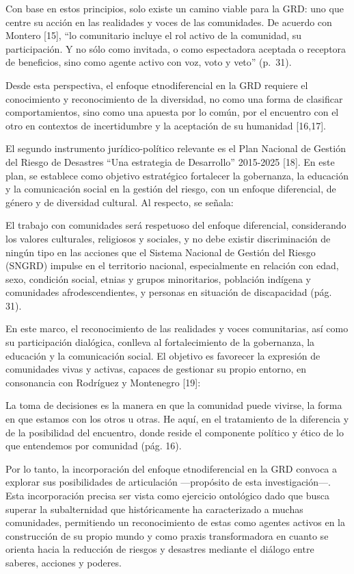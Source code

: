 \documentclass[
  spanish,
  letterpaper,
]{book}
\begin{document}
Con base en estos principios, solo existe un camino viable para la GRD:
uno que centre su acción en las realidades y voces de las comunidades.
De acuerdo con Montero {[}15{]}, ``lo comunitario incluye el rol activo
de la comunidad, su participación. Y no sólo como invitada, o como
espectadora aceptada o receptora de beneficios, sino como agente activo
con voz, voto y veto'' (p.~31).

Desde esta perspectiva, el enfoque etnodiferencial en la GRD requiere el
conocimiento y reconocimiento de la diversidad, no como una forma de
clasificar comportamientos, sino como una apuesta por lo común, por el
encuentro con el otro en contextos de incertidumbre y la aceptación de
su humanidad {[}16,17{]}.

El segundo instrumento jurídico-político relevante es el Plan Nacional
de Gestión del Riesgo de Desastres ``Una estrategia de Desarrollo''
2015-2025 {[}18{]}. En este plan, se establece como objetivo estratégico
fortalecer la gobernanza, la educación y la comunicación social en la
gestión del riesgo, con un enfoque diferencial, de género y de
diversidad cultural. Al respecto, se señala:

El trabajo con comunidades será respetuoso del enfoque diferencial,
considerando los valores culturales, religiosos y sociales, y no debe
existir discriminación de ningún tipo en las acciones que el Sistema
Nacional de Gestión del Riesgo (SNGRD) impulse en el territorio
nacional, especialmente en relación con edad, sexo, condición social,
etnias y grupos minoritarios, población indígena y comunidades
afrodescendientes, y personas en situación de discapacidad (pág. 31).

En este marco, el reconocimiento de las realidades y voces comunitarias,
así como su participación dialógica, conlleva al fortalecimiento de la
gobernanza, la educación y la comunicación social. El objetivo es
favorecer la expresión de comunidades vivas y activas, capaces de
gestionar su propio entorno, en consonancia con Rodríguez y Montenegro
{[}19{]}:

La toma de decisiones es la manera en que la comunidad puede vivirse, la
forma en que estamos con los otros u otras. He aquí, en el tratamiento
de la diferencia y de la posibilidad del encuentro, donde reside el
componente político y ético de lo que entendemos por comunidad (pág.
16).

Por lo tanto, la incorporación del enfoque etnodiferencial en la GRD
convoca a explorar sus posibilidades de articulación ---propósito de
esta investigación---. Esta incorporación precisa ser vista como
ejercicio ontológico dado que busca superar la subalternidad que
históricamente ha caracterizado a muchas comunidades, permitiendo un
reconocimiento de estas como agentes activos en la construcción de su
propio mundo y como praxis transformadora en cuanto se orienta hacia la
reducción de riesgos y desastres mediante el diálogo entre saberes,
acciones y poderes.
\end{document}
